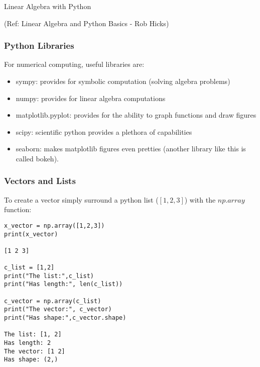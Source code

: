 \begin{frame}[fragile]\frametitle{}
\begin{center}
{\Large Linear Algebra with Python}

{\tiny (Ref: Linear Algebra and Python Basics - Rob Hicks)}

\end{center}
\end{frame}


 \begin{frame}[fragile] \frametitle{Python Libraries}

For numerical computing, useful libraries are:

\begin{itemize}

\item sympy: provides for symbolic computation (solving algebra problems)
\item numpy: provides for linear algebra computations
\item matplotlib.pyplot: provides for the ability to graph functions and draw figures
\item scipy: scientific python provides a plethora of capabilities
\item seaborn: makes matplotlib figures even pretties (another library like this is called bokeh).
\end{itemize}

\end{frame}




 \begin{frame}[fragile] \frametitle{Vectors and Lists}
To create a vector simply surround a python list ($[1,2,3]$) with the $np.array$ function:

\begin{lstlisting}
x_vector = np.array([1,2,3])
print(x_vector)

[1 2 3]

c_list = [1,2]
print("The list:",c_list)
print("Has length:", len(c_list))

c_vector = np.array(c_list)
print("The vector:", c_vector)
print("Has shape:",c_vector.shape)

The list: [1, 2]
Has length: 2
The vector: [1 2]
Has shape: (2,)
\end{lstlisting}

\end{frame}

